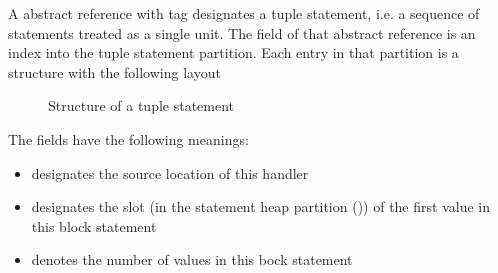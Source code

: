A  abstract reference with tag  designates a tuple statement, i.e. a sequence of statements treated as a single unit.
The  field of that abstract reference is an index into the tuple statement partition.
Each entry in that partition is a structure with the following layout
%
\begin{figure}[H]
	\centering
	\caption{Structure of a tuple statement}
	\label{fig:ifc-tuple-stmt-structure}
\end{figure}
%
The fields have the following meanings:
\begin{itemize}
	\item {} designates the source location of this handler
	\item {} designates the slot (in the statement heap partition ()) of the first  value in this block statement
	\item {} denotes the number of  values in this bock statement 
\end{itemize}


